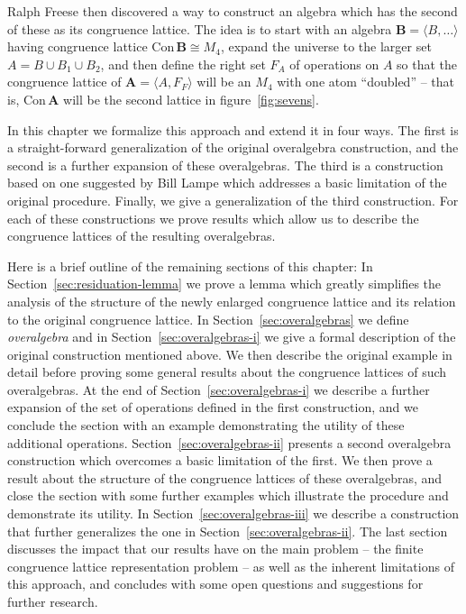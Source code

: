 \documentclass[cm,dissertation]{uhthesis}
\theoremstyle{plain}
\theoremstyle{definition}
\theoremstyle{remark}
\numberwithin{theorem}{section}
\numberwithin{claim}{chapter}
\numberwithin{equation}{section}
\numberwithin{conjecture}{chapter}
\newcommand{\<}{\ensuremath{\langle}}
\renewcommand{\>}{\ensuremath{\rangle}}
\newcommand{\Con}{\ensuremath{\mathrm{Con\,}}}
\newcommand{\0}{\ensuremath{\mathbf{0}}}
\newcommand{\1}{\ensuremath{\mathbf{1}}}
\newcommand{\2}{\ensuremath{\mathbf{2}}}
\newcommand{\3}{\ensuremath{\mathbf{3}}}
\newcommand{\4}{\ensuremath{\mathbf{4}}}
\newcommand{\5}{\ensuremath{\mathbf{5}}}
\newcommand{\bA}{\ensuremath{\mathbf{A}}}
\newcommand{\bB}{\ensuremath{\mathbf{B}}}
\begin{document}
%
\noindent Ralph Freese then discovered a way to construct an algebra 
which has the second of these as its congruence lattice. The idea 
is to start with an algebra $\bB = \<B, \dots\>$ having congruence lattice $\Con \bB
\cong M_4$, expand the universe to the larger set $A = B\cup B_1 \cup B_2$, and
then define the right set $F_A$ of operations on $A$ so that the congruence lattice
of $\bA = \< A, F_F\>$ will be an $M_4$ with one atom ``doubled'' -- that is,
$\Con\bA$ will be the second lattice in figure~\ref{fig:sevens}.

In this chapter we formalize this approach and extend it in four ways.  The first
is a straight-forward generalization of the original overalgebra construction,
and the second is a further expansion of these overalgebras.
The third is a construction based on one suggested by 
%
Bill Lampe which addresses a basic
limitation of the original procedure.  Finally, we give a generalization of the third
construction.  For each of these constructions we prove
results which allow us to describe the congruence lattices of the resulting
overalgebras. 

Here is a brief outline of the remaining sections of this chapter:
In Section~\ref{sec:residuation-lemma} we prove a lemma which greatly simplifies the
analysis of the structure of the newly enlarged congruence lattice and
its relation to the original congruence lattice.
In Section~\ref{sec:overalgebras} we define {\it overalgebra} and in 
Section~\ref{sec:overalgebras-i} we give a formal description of
the original construction mentioned above.  We then describe the
original example in detail before proving some general results about
the congruence lattices of such overalgebras.
At the end of Section~\ref{sec:overalgebras-i} we describe a further expansion
of the set of operations defined in the first construction, and we conclude the
section with an example demonstrating the utility of these additional operations.
Section~\ref{sec:overalgebras-ii}
presents a second overalgebra construction which overcomes a basic limitation 
of the first.  We then
prove a result about the structure of the congruence lattices of these overalgebras,
and close the section with some further examples which illustrate the procedure and
demonstrate its utility.  In Section~\ref{sec:overalgebras-iii}
we describe a construction that further generalizes the one in
Section~\ref{sec:overalgebras-ii}. 
The last section discusses the impact that our results
have on the main problem -- the finite congruence lattice representation problem
-- as well as the inherent limitations of this approach, and concludes with some
open questions and suggestions for further research.  
\end{document}
